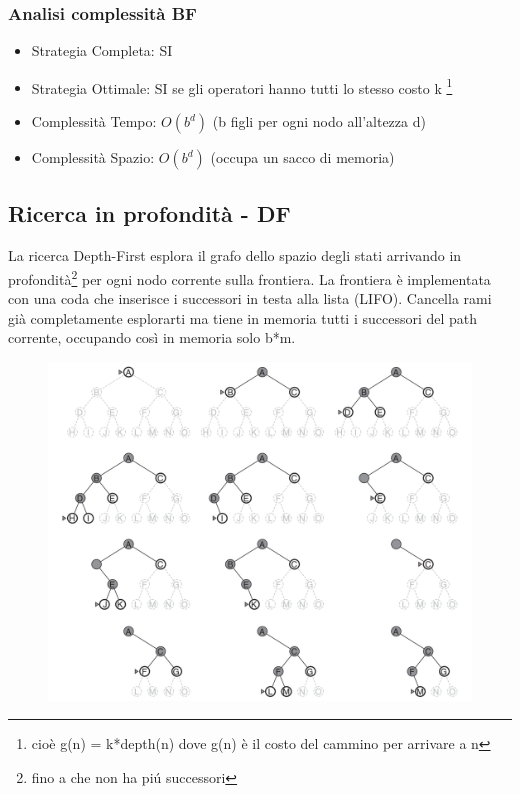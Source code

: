 \documentclass{article}
\begin{document}
\subsubsection{Analisi complessità BF}
\begin{itemize}
    \item Strategia Completa: SI
    \item Strategia Ottimale: SI se gli operatori hanno tutti lo stesso costo k \footnote{cioè g(n) = k*depth(n) dove g(n) è il costo del cammino per arrivare a n}
    \item Complessità Tempo: $O(b^d)$ (b figli per ogni nodo all'altezza d)
    \item Complessità Spazio: $O(b^d)$ (occupa un sacco di memoria)
\end{itemize}

\subsection{Ricerca in profondità - DF}
La ricerca Depth-First esplora il grafo dello spazio degli stati arrivando in profondità\footnote{fino a che non ha piú successori} per ogni nodo corrente sulla frontiera. La frontiera è implementata con una coda che inserisce i successori in testa alla lista (LIFO). Cancella rami già completamente esplorarti ma tiene in memoria tutti i successori del path corrente, occupando così in memoria solo b*m.
\begin{figure}[H]
    \centering
    \includegraphics[scale=0.3]{Images/dfsearch.png}
\end{figure}
\end{document}
